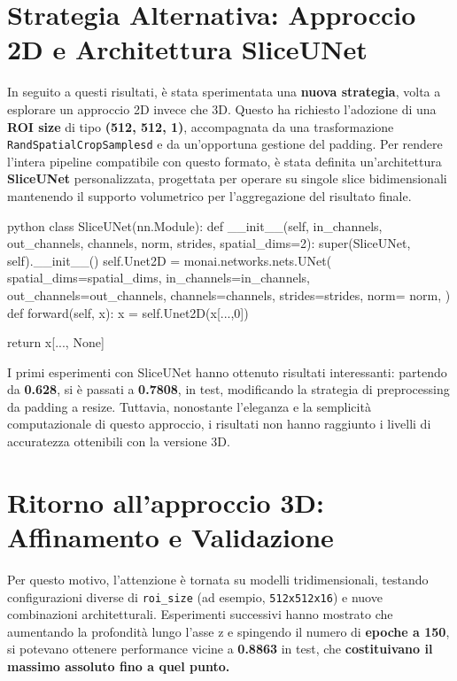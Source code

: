 \section{Strategia Alternativa: Approccio 2D e Architettura SliceUNet}

In seguito a questi risultati, è stata sperimentata una \textbf{nuova strategia}, volta a esplorare un approccio 2D invece che 3D. Questo ha richiesto l’adozione di una \textbf{ROI size} di tipo \textbf{(512, 512, 1)}, accompagnata da una trasformazione \texttt{RandSpatialCropSamplesd} e da un’opportuna gestione del padding. Per rendere l’intera pipeline compatibile con questo formato, è stata definita un’architettura \textbf{SliceUNet} personalizzata, progettata per operare su singole slice bidimensionali mantenendo il supporto volumetrico per l’aggregazione del risultato finale.

\begin{code}{python}
class SliceUNet(nn.Module):
    def __init__(self, in_channels, out_channels, channels, norm, strides, spatial_dims=2):
        super(SliceUNet, self).__init__()
        self.Unet2D = monai.networks.nets.UNet(
            spatial_dims=spatial_dims,
            in_channels=in_channels,
            out_channels=out_channels,
            channels=channels,
            strides=strides,
            norm= norm,
        )
    def forward(self, x):
        x = self.Unet2D(x[...,0]) 

        return x[..., None]
\end{code}



I primi esperimenti con SliceUNet hanno ottenuto risultati interessanti: partendo da \textbf{0.628}, si è passati a \textbf{0.7808}, in test, modificando la strategia di preprocessing da padding a resize. Tuttavia, nonostante l’eleganza e la semplicità computazionale di questo approccio, i risultati non hanno raggiunto i livelli di accuratezza ottenibili con la versione 3D.

\section{Ritorno all’approccio 3D: Affinamento e Validazione}

Per questo motivo, l’attenzione è tornata su modelli tridimensionali, testando configurazioni diverse di \texttt{roi\_size} (ad esempio, \texttt{512x512x16}) e nuove combinazioni architetturali. Esperimenti successivi hanno mostrato che aumentando la profondità lungo l’asse z e spingendo il numero di \textbf{epoche a 150}, si potevano ottenere performance vicine a \textbf{0.8863} in test, che \textbf{costituivano il massimo assoluto fino a quel punto.}


